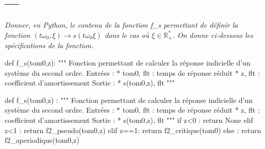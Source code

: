 \documentclass[10pt]{article}
\newif\ifprof
\begin{document}
\ifprof
\begin{corrige}
\begin{py}
\begin{python}
def f_critique(t,om0):
    """
    Fonction permettant de calculer s(t) dans le cas ou z>1. 
    Entrées :
        * t, flt : le temps en secondes
        * om0, flt : la pulsation en rad.s-1
    Sortie : 
        * res, flt : s(t). Ici, sans unité.
    """
    return 1-(1+t*om0)*math.exp(-om0*t) 
\end{python}
\end{py}
\end{corrige}
\else

\begin{tabular}{|p{}|}
\hline
$$\quad$$
\vspace{1cm}
$$\quad$$ \\
\hline
\end{tabular}
\fi

\subparagraph{} \textit{Donner, en Python, le contenu de la fonction \textsf{f\_s} permettant de définir la fonction $(t\omega_0,\xi) \rightarrow s(t\omega_0\xi)$ dans le cas où $\xi\in \mathbb{R}_+^*$. On donne ci-dessous les spécifications de la fonction.}

\begin{py}
\begin{python}
def f_s(tom0,z):
    """
    Fonction permettant de calculer la réponse indicielle d'un système du second ordre. 
    Entrées : 
        * tom0, flt : temps de réponse réduit
        * z, flt : coefficient d'amortissement
    Sortie : 
        * s(tom0,z), flt
    """
\end{python}
\end{py}

\ifprof
\begin{corrige}
\begin{py}
\begin{python}
def f_s(tom0,z) :
    """
    Fonction permettant de calculer la réponse indicielle d'un système du second ordre. 
    Entrées : 
        * tom0, flt : temps de réponse réduit
        * z, flt : coefficient d'amortissement
    Sortie : 
        * s(tom0,z), flt
    """
    if z<0 :
        return None
    elif z<1 :
        return f2_pseudo(tom0,z)
    elif z==1:
        return f2_critique(tom0)
    else : 
        return f2_aperiodique(tom0,z)
\end{python}
\end{py}
\end{corrige}
\else
\end{document}
